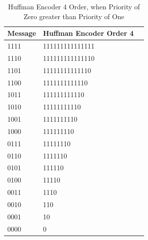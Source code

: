 \begin{refsection}
\begin{table}[H]
\centering
\caption{Huffman Encoder 4 Order, when Priority of Zero greater than Priority of One}
\label{tb:hufmmanencoder7}
\begin{tabular}{|l|l|l|}
\hline
\textbf{Message}                      & \textbf{Huffman Encoder Order 4}                                       \\ \hline
1111                 & 111111111111111                                                         \\ \hline
1110                 & 111111111111110                                              \\ \hline
1101                 & 11111111111110                                            \\ \hline
1100                 & 1111111111110                                       \\ \hline
1011                 & 111111111110                                                          \\ \hline
1010                 & 11111111110                                                          \\ \hline
1001                 & 1111111110                                                         \\ \hline
1000                 & 111111110                                                         \\ \hline
0111                 & 11111110                                                          \\ \hline
0110                 & 1111110                                                          \\ \hline
0101                 & 111110                                                         \\ \hline
0100                 & 11110                                                   \\ \hline
0011                 & 1110                                                          \\ \hline
0010                 & 110                                                          \\ \hline
0001                 & 10                                                         \\ \hline
0000                 & 0                                                         \\ \hline
\end{tabular}
\end{table}


\end{refsection}
